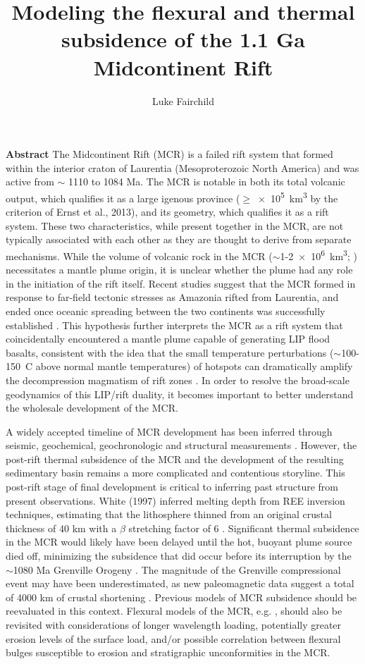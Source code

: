 \documentclass[11pt,a4paper]{article}
\title{Modeling the flexural and thermal subsidence of the 1.1 Ga Midcontinent Rift}
\author{Luke Fairchild}
\begin{document}
\maketitle{}
\textbf{Abstract}
The Midcontinent Rift (MCR) is a failed rift system that formed within the interior craton of Laurentia (Mesoproterozoic North America) and was active from $\sim$ 1110 to 1084 Ma. The MCR is notable in both its total volcanic output, which qualifies it as a large igenous province ($\geq$\SI{e5}{km^3} by the criterion of Ernst et al., 2013\nocite{Ernst2013b}), and its geometry, which qualifies it as a rift system. These two characteristics, while present together in the MCR, are not typically associated with each other as they are thought to derive from separate mechanisms. While the volume of volcanic rock in the MCR ($\sim$1-\SI{2e6}{km^3}; \cite{Hutchinson1990a}) necessitates a mantle plume origin, it is unclear whether the plume had any role in the initiation of the rift itself. Recent studies suggest that the MCR formed in response to far-field tectonic stresses as Amazonia rifted from Laurentia, and ended once oceanic spreading between the two continents was successfully established \cite{Stein2014a}. This hypothesis further interprets the MCR as a rift system that coincidentally encountered a mantle plume capable of generating LIP flood basalts, consistent with the idea that the small temperature perturbations ($\sim$100-150\textdegree\ C above normal mantle temperatures) of hotspots can dramatically amplify the decompression magmatism of rift zones \cite{White1989a}. In order to resolve the broad-scale geodynamics of this LIP/rift duality, it becomes important to better understand the wholesale development of the MCR.\par{}
A widely accepted timeline of MCR development has been inferred through seismic, geochemical, geochronologic and structural measurements \cite{Cannon1989a,Cannon1992b,White1997a,Stein2015a}. However, the post-rift thermal subsidence of the MCR and the development of the resulting sedimentary basin remains a more complicated and contentious storyline. This post-rift stage of final development is critical to inferring past structure from present observations. White (1997)\nocite{White1997a} inferred melting depth from REE inversion techniques, estimating that the lithosphere thinned from an original crustal thickness of 40 km with a $\beta$ stretching factor of 6 \cite{McKenzie1978a}. Significant thermal subsidence in the MCR would likely have been delayed until the hot, buoyant plume source died off, minimizing the subsidence that did occur before its interruption by the $\sim$1080 Ma Grenville Orogeny \cite{White1997a}. The magnitude of the Grenville compressional event may have been underestimated, as new paleomagnetic data suggest a total of 4000 km of crustal shortening \cite{Halls2015a}. Previous models of MCR subsidence should be reevaluated in this context. Flexural models of the MCR, e.g. \cite{Nyquist1988a}, should also be revisited with considerations of longer wavelength loading, potentially greater erosion levels of the surface load, and/or possible correlation between flexural bulges susceptible to erosion and stratigraphic unconformities in the MCR.\par{}
\end{document}
